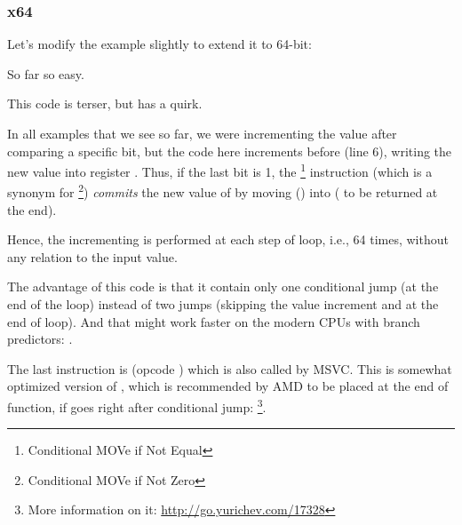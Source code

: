 \subsubsection{x64}
\label{subsec:popcnt}

Let's modify the example slightly to extend it to 64-bit:




So far so easy.






This code is terser, but has a quirk.

In all examples that we see so far, we were incrementing the  value after comparing a specific bit,
but the code here increments  before (line 6), writing the new value into register \EDX .
Thus, if the last bit is 1, the \CMOVNE\footnote{Conditional MOVe if Not Equal} instruction
(which is a synonym for \CMOVNZ\footnote{Conditional MOVe if Not Zero}) \emph{commits} 
the new value of 
by moving \EDX () into \EAX ( to be returned at the end).

Hence, the incrementing is performed at each step of loop, i.e., 64 times, without any relation to the input value.

The advantage of this code is that it contain only one conditional jump (at the end of the loop) instead of 
two jumps (skipping the  value increment and at the end of loop).
And that might work faster on the modern CPUs with branch predictors: .

\label{FATRET}
The last instruction is  (opcode ) 
which is also called  by MSVC.
This is somewhat optimized version of \RET, 
which is recommended by AMD to be placed at the end of function, if \RET goes right after conditional jump: 
\footnote{More information on it: \url{http://go.yurichev.com/17328}}.

